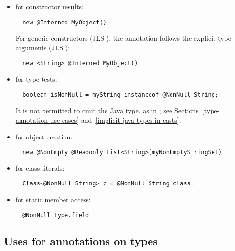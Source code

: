 \documentclass[10pt]{article}
\begin{document}
\begin{itemize}
\item for constructor results:

\preverbnegspace
\begin{Verbatim}
  new @Interned MyObject()
\end{Verbatim}
\preverbnegspace

For generic constructors (JLS ), the
annotation follows the explicit type arguments (JLS
):

\preverbnegspace
\begin{Verbatim}
  new <String> @Interned MyObject()
\end{Verbatim}

\item for type tests:
\preverbnegspace
\begin{Verbatim}
  boolean isNonNull = myString instanceof @NonNull String;
\end{Verbatim}
\preverbnegspace
It is not permitted to omit the Java type, as in
; see
Sections~\ref{type-annotation-use-cases} and~\ref{implicit-java-types-in-casts}.

\item for object creation:
\preverbnegspace
\begin{Verbatim}
  new @NonEmpty @Readonly List<String>(myNonEmptyStringSet)
\end{Verbatim}

\item for class literals:
\preverbnegspace
\begin{Verbatim}
  Class<@NonNull String> c = @NonNull String.class;
\end{Verbatim}


\item for static member access:
\preverbnegspace
\begin{Verbatim}
  @NonNull Type.field
\end{Verbatim}

\end{itemize}


\subsection{Uses for annotations on types\label{type-annotation-use-cases}}
\end{document}

